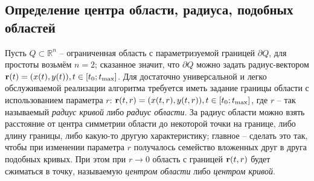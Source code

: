\documentclass[a4paper, 12pt]{article}
\newcommand{\R}[1]{\mathbb{R}^#1}
\begin{document}
\subsection{Определение центра области, радиуса, подобных областей}
Пусть $Q \subset \R{n} $ -- ограниченная область с параметризуемой границей $\partial Q$, для простоты возьмём $n=2$;
сказанное значит, что $\partial Q$ можно задать радиус-вектором ${\bf r}(t)=(x(t),y(t)), t \in [t_0;t_{\max}]$.
Для достаточно универсальной и легко обслуживаемой реализации алгоритма требуется иметь задание границы области с использованием параметра $r$: ${\bf r}(t,r)=(x(t,r),y(t,r)), t \in [t_0;t_{\max}]$, где $r$ -- так называемый {\it радиус кривой} либо {\it радиус области}. За радиус области можно взять расстояние от центра симметрии области до некоторой точки на границе, либо длину границы, либо какую-то другую характеристику; главное -- сделать это так, чтобы при изменении параметра $r$ получалось семейство вложенных друг в друга подобных кривых. При этом при $r \rightarrow 0$ область с границей ${\bf r}(t,r)$ будет сжиматься в точку, называемую {\it центром области} либо {\it центром кривой}.
\end{document}
